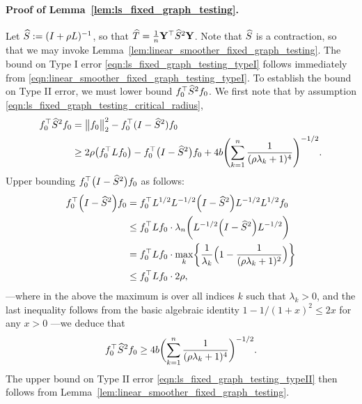 \paragraph{Proof of Lemma~\ref{lem:ls_fixed_graph_testing}.}
Let $\widehat{S} := (I + \rho L)^{-1}$, so that $\widehat{T} = \frac{1}{n}{\bf Y}^{\top} \widehat{S}^2 {\bf Y}$. Note that $\widehat{S}$ is a contraction, so that we may invoke Lemma~\ref{lem:linear_smoother_fixed_graph_testing}. The bound on Type I error \eqref{eqn:ls_fixed_graph_testing_typeI} follows immediately from \eqref{eqn:linear_smoother_fixed_graph_testing_typeI}. 
To establish the bound on Type II error, we must lower bound $f_0^{\top} \widehat{S}^2 f_0$. We first note that by assumption \eqref{eqn:ls_fixed_graph_testing_critical_radius},
\begin{align*}
f_0^{\top} \widehat{S}^2 f_0 & = \bigl\|f_0\bigr\|_2^2 - f_0^{\top}(I - \widehat{S}^2)f_0 \\
& \geq 2 \rho \bigl(f_0^{\top} L f_0\bigr) - f_0^{\top}\bigl(I - \widehat{S}^2\bigr)f_0 + 4b \Biggl(\sum_{k = 1}^{n} \frac{1}{(\rho\lambda_k + 1)^4} \Biggr)^{-1/2}.
\end{align*}
Upper bounding $f_0^{\top}\bigl(I - \widehat{S}^2\bigr)f_0$ as follows:
\begin{equation*}
\begin{aligned}
f_0^{\top} \Bigl(I - \widehat{S}^2\Bigr) f_0  & = f_0^{\top} L^{1/2} L^{-1/2}\Bigl(I - \widehat{S}^2\Bigr) L^{-1/2} L^{1/2} f_0 \\ 
& \leq f_0^{\top} L f_0 \cdot  \lambda_{n}\biggl(L^{-1/2}\Bigl(I - \widehat{S}^2\Bigr) L^{-1/2}\biggr) \\ 
& = f_0^{\top} L f_0 \cdot \max_{k} \biggl\{ \frac{1}{\lambda_k} \Bigl(1 - \frac{1}{(\rho \lambda_k + 1)^2}\Bigr) \biggr\} \\
& \leq f_0^{\top} L f_0 \cdot 2\rho,
\end{aligned}
\end{equation*}
---where in the above the maximum is over all indices $k$ such that $\lambda_k > 0$, and the last inequality follows from the basic algebraic identity $1 - 1/(1 + x)^2 \leq 2 x$ for any $x > 0$ ---we deduce that
\begin{equation*}
f_0^{\top} \widehat{S}^2 f_0 \geq 4b \biggl(\sum_{k = 1}^{n} \frac{1}{(\rho\lambda_k + 1)^4} \biggr)^{-1/2}.
\end{equation*} 
The upper bound on Type II error \eqref{eqn:ls_fixed_graph_testing_typeII} then follows from Lemma~\ref{lem:linear_smoother_fixed_graph_testing}.

